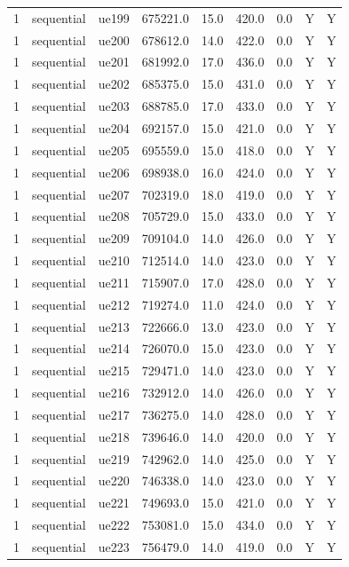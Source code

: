 \begin{table}[ht]
\begin{tabular}{|c|c|c|c|c|c|c|c|c|}
1 & sequential & ue199 & 675221.0 & 15.0 & 420.0 & 0.0 & Y & Y \\
1 & sequential & ue200 & 678612.0 & 14.0 & 422.0 & 0.0 & Y & Y \\
1 & sequential & ue201 & 681992.0 & 17.0 & 436.0 & 0.0 & Y & Y \\
1 & sequential & ue202 & 685375.0 & 15.0 & 431.0 & 0.0 & Y & Y \\
1 & sequential & ue203 & 688785.0 & 17.0 & 433.0 & 0.0 & Y & Y \\
1 & sequential & ue204 & 692157.0 & 15.0 & 421.0 & 0.0 & Y & Y \\
1 & sequential & ue205 & 695559.0 & 15.0 & 418.0 & 0.0 & Y & Y \\
1 & sequential & ue206 & 698938.0 & 16.0 & 424.0 & 0.0 & Y & Y \\
1 & sequential & ue207 & 702319.0 & 18.0 & 419.0 & 0.0 & Y & Y \\
1 & sequential & ue208 & 705729.0 & 15.0 & 433.0 & 0.0 & Y & Y \\
1 & sequential & ue209 & 709104.0 & 14.0 & 426.0 & 0.0 & Y & Y \\
1 & sequential & ue210 & 712514.0 & 14.0 & 423.0 & 0.0 & Y & Y \\
1 & sequential & ue211 & 715907.0 & 17.0 & 428.0 & 0.0 & Y & Y \\
1 & sequential & ue212 & 719274.0 & 11.0 & 424.0 & 0.0 & Y & Y \\
1 & sequential & ue213 & 722666.0 & 13.0 & 423.0 & 0.0 & Y & Y \\
1 & sequential & ue214 & 726070.0 & 15.0 & 423.0 & 0.0 & Y & Y \\
1 & sequential & ue215 & 729471.0 & 14.0 & 423.0 & 0.0 & Y & Y \\
1 & sequential & ue216 & 732912.0 & 14.0 & 426.0 & 0.0 & Y & Y \\
1 & sequential & ue217 & 736275.0 & 14.0 & 428.0 & 0.0 & Y & Y \\
1 & sequential & ue218 & 739646.0 & 14.0 & 420.0 & 0.0 & Y & Y \\
1 & sequential & ue219 & 742962.0 & 14.0 & 425.0 & 0.0 & Y & Y \\
1 & sequential & ue220 & 746338.0 & 14.0 & 423.0 & 0.0 & Y & Y \\
1 & sequential & ue221 & 749693.0 & 15.0 & 421.0 & 0.0 & Y & Y \\
1 & sequential & ue222 & 753081.0 & 15.0 & 434.0 & 0.0 & Y & Y \\
1 & sequential & ue223 & 756479.0 & 14.0 & 419.0 & 0.0 & Y & Y \\

\end{tabular}
\end{table}
